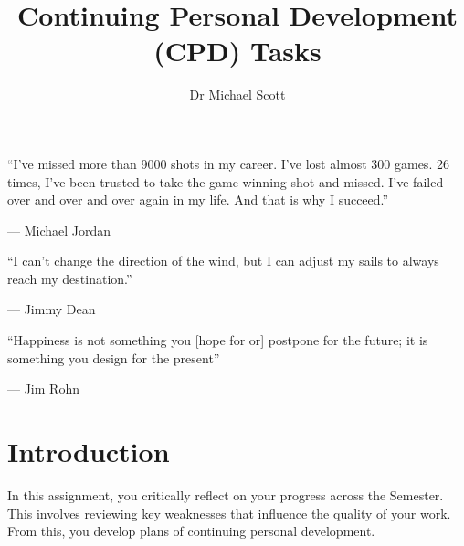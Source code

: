 \documentclass{../fal_assignment}
\title{Continuing Personal Development (CPD) Tasks}
\author{Dr Michael Scott}
\begin{document}
\maketitle
%    
\begin{marginquote}
    ``I've missed more than 9000 shots in my career. I've lost almost 300 games. 26 times, I've been trusted to take the game winning shot and missed. I've failed over and over and over again in my life. And that is why I succeed.''
    
    --- Michael Jordan

    \marginquoterule

    ``I can't change the direction of the wind, but I can adjust my sails to always reach my destination.''
    
    --- Jimmy Dean
    
    \marginquoterule

    ``Happiness is not something you [hope for or] postpone for the future; it is something you design for the present''
    
    --- Jim Rohn
\end{marginquote}

\section*{Introduction}

In this assignment, you critically reflect on your progress across the Semester. This involves reviewing key weaknesses that influence the quality of your work. From this, you develop plans of continuing personal development.
\end{document}
